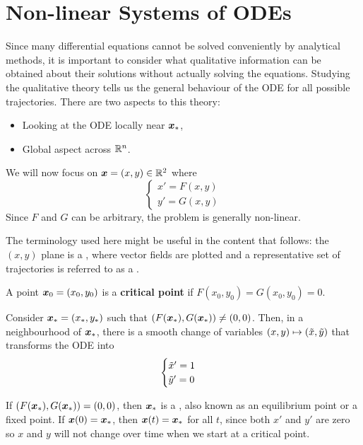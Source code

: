 \section{Non-linear Systems of ODEs}

Since many differential equations cannot be solved conveniently by analytical methods, it is important to consider what qualitative information can be obtained about their solutions without actually solving the equations. Studying the qualitative theory tells us the general behaviour of the ODE for all possible trajectories. There are two aspects to this theory:
\begin{itemize}
	\item Looking at the ODE locally near $\bm{x}_{\ast}$,
	\item Global aspect across $\mathbb{R}^n$.
\end{itemize}

We will now focus on $\bm{x} = (x, y) \in \mathbb{R}^2$ where 
\begin{equation}\label{eq:linearsystem2}
	\begin{cases}
		x' = F(x,y) \\
		y' = G(x,y)
	\end{cases}
\end{equation}
Since $F$ and $G$ can be arbitrary, the problem is generally non-linear.

The terminology used here might be useful in the content that follows: the $(x,y)$ plane is a , where vector fields are plotted and a representative set of trajectories is referred to as a .

\begin{definition}
	A point $\bm{x}_0 = (x_0, y_0)$ is a \textbf{critical point} if $F(x_0, y_0) = G(x_0, y_0) = 0$.
\end{definition}

\begin{theorem}
	Consider $\bm{x}_{\ast} = (x_{\ast}, y_{\ast})$ such that $(F(\bm{x}_{\ast}), G(\bm{x}_{\ast})) \neq (0,0)$. Then, in a neighbourhood of $\bm{x}_{\ast}$, there is a smooth change of variables $(x,y) \mapsto (\Tilde{x}, \Tilde{y})$ that transforms the ODE into 
	\[
	\begin{cases}
		\Tilde{x}' = 1 \\
		\Tilde{y}' = 0
	\end{cases}
	\]
\end{theorem}

If $(F(\bm{x}_{\ast}), G(\bm{x}_{\ast})) = (0,0)$, then $\bm{x}_{\ast}$ is a , also known as an equilibrium point or a fixed point. If $\bm{x}(0) = \bm{x}_{\ast}$, then $\bm{x}(t) = \bm{x}_{\ast}$ for all $t$, since both $x'$ and $y'$ are zero so $x$ and $y$ will not change over time when we start at a critical point.

